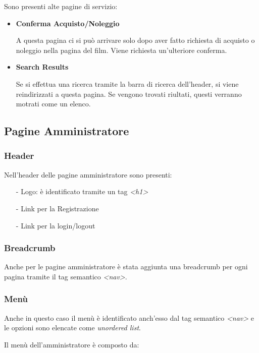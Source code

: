 \documentclass[a4paper]{article}
\begin{document}
Sono presenti alte pagine di servizio:

\begin{itemize}
    \item \textbf{Conferma Acquisto/Noleggio}

    A questa pagina ci si può arrivare solo dopo aver fatto richiesta di acquisto o noleggio nella pagina del film.
    Viene richiesta un'ulteriore conferma.

    \item \textbf{Search Results}

    Se si effettua una ricerca tramite la barra di ricerca dell'header, si viene reindirizzati a questa pagina.
    Se vengono trovati riultati, questi verranno motrati come un elenco.

\end{itemize}

\subsection{Pagine Amministratore}

\subsubsection{Header}

Nell'header delle pagine amministratore sono presenti:
\begin{itemize}
    \item [-] Logo: è identificato tramite un tag \textit{<h1>}
    \item [-] Link per la Registrazione
    \item [-] Link per la login/logout
\end{itemize}

\subsubsection{Breadcrumb}
Anche per le pagine amministratore è stata aggiunta una breadcrumb per ogni pagina tramite il tag semantico \textit{<nav>}.

\subsubsection{Menù}
Anche in questo caso il menù è identificato anch'esso dal tag semantico \textit{<nav>} e le opzioni sono elencate come \textit{unordered list}.

Il menù dell'amministratore è composto da:
\end{document}

